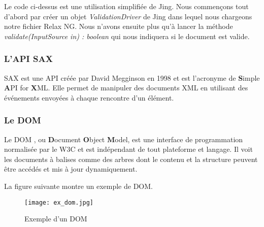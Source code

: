 \par
Le code ci-dessus est une utilisation simplifiée de Jing. Nous commençons tout d'abord par créer un objet \emph{ValidationDriver} de Jing dans lequel nous chargeons notre fichier Relax NG. Nous n'avons ensuite plus qu'à lancer la méthode \emph{validate(InputSource in) : boolean} qui nous indiquera si le document est valide.


\subsubsection{L'API SAX}

SAX \cite{sax_website, sax_oracle} est une API créée par David Megginson en 1998 et est l'acronyme de \textbf{S}imple \textbf{A}PI for \textbf{X}ML. Elle permet de manipuler des documents XML en utilisant des événements envoyées à chaque rencontre d'un élément.


\subsubsection{Le DOM}

Le DOM \cite{dom_w3c} , ou \textbf{D}ocument \textbf{O}bject \textbf{M}odel, est une interface de programmation normalisée par le W3C et est indépendant de tout plateforme et langage. Il voit les documents à balises comme des arbres dont le contenu et la structure peuvent être accédés et mis à jour dynamiquement.

\par
La figure suivante montre un exemple de DOM.

\begin{figure}[!h]
\centering
\texttt{[image: ex\_dom.jpg]}\\[1cm]
\caption{Exemple d'un DOM}
\label{Exemple d'un DOM}
\end{figure}

